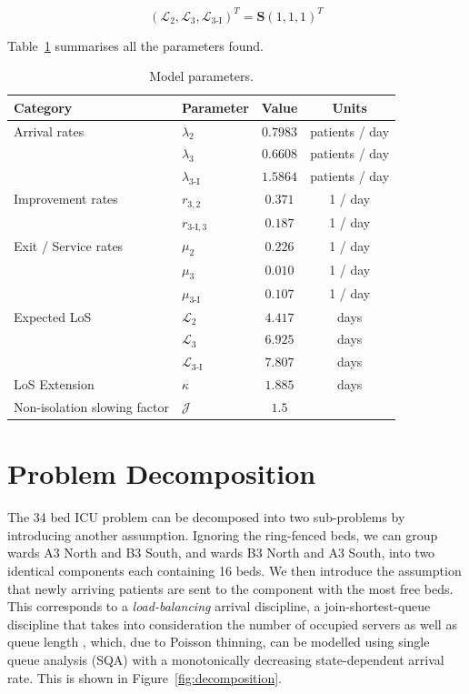 \documentclass{article}
\begin{document}
\begin{equation}\label{eqn:expected_remaining_time}
(\mathcal{L}_2, \mathcal{L}_3, \mathcal{L}_{3\text{-I}})^T = \mathbf{S} (1, 1, 1)^{T}
\end{equation}

Table~\ref{tbl:model_parameters} summarises all the parameters found.


\begin{table}[htbp]
\centering
\begin{tabular}{llcc}
\toprule
\textbf{Category} & \textbf{Parameter} & \textbf{Value} & \textbf{Units} \\
\midrule
Arrival rates & $\lambda_2$ & $0.7983$ & patients / day \\
              & $\lambda_3$ & $0.6608$ & patients / day \\
              & $\lambda_{3\text{-I}}$ & $1.5864$ & patients / day \\[2.5mm]
Improvement rates & $r_{3,2}$   & $0.371$ & 1 / day \\
                  & $r_{3\text{-I},3}$ & $0.187$ & 1 / day \\[2.5mm]
Exit / Service rates & $\mu_2$     & $0.226$ & 1 / day \\
                     & $\mu_3$     & $0.010$ & 1 / day \\
                     & $\mu_{3\text{-I}}$ & $0.107$ & 1 / day \\[2.5mm]
Expected LoS & $\mathcal{L}_2$ & $4.417$ & days \\
             & $\mathcal{L}_3$ & $6.925$ & days \\
             & $\mathcal{L}_{3\text{-I}}$ & $7.807$ & days \\[2.5mm]
LoS Extension & $\kappa$ & $1.885$ & days \\[2.5mm]
Non-isolation slowing factor & $\mathcal{J}$ & $1.5$ & \\
\bottomrule
\end{tabular}
\caption{Model parameters.}
\label{tbl:model_parameters}
\end{table}


\section{Problem Decomposition}\label{sec:decomposition}
The 34 bed ICU problem can be decomposed into two sub-problems by introducing
another assumption.
Ignoring the ring-fenced beds, we can group wards A3 North and B3 South, and
wards B3 North and A3 South, into two identical components each containing 16
beds.
We then introduce the assumption that newly arriving patients are sent to the
component with the most free beds.
This corresponds to a \textit{load-balancing} arrival discipline,
a join-shortest-queue discipline that takes into consideration the number of
occupied servers as well as queue length \cite{kingman61, gupta07}, which, due
to Poisson thinning, can be modelled using single queue analysis (SQA) with a
monotonically decreasing state-dependent arrival rate.
This is shown in Figure~\ref{fig:decomposition}.
\end{document}
